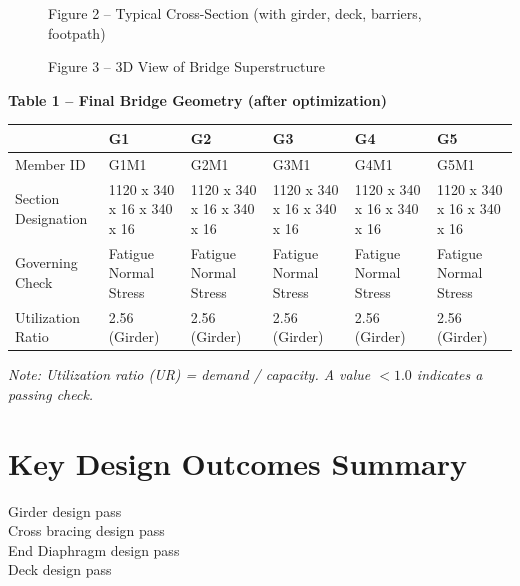 \documentclass[12pt,a4paper]{report}
\numberwithin{table}{chapter}
\numberwithin{figure}{chapter}
\begin{document}
\newpage

\begin{figure}[H]
\centering
{}
\caption*{Figure 2 -- Typical Cross-Section (with girder, deck, barriers, footpath)}
\end{figure}

\begin{figure}[H]
\centering
{}
\caption*{Figure 3 -- 3D View of Bridge Superstructure}
\end{figure}

\noindent\textbf{Table 1 -- Final Bridge Geometry (after optimization)}

\vspace{0.4em}
\noindent
\begin{tabular}{|C{2.8cm}|C{2.4cm}|C{2.4cm}|C{2.4cm}|C{2.4cm}|C{2.4cm}|}
\hline
  \textbf{} &
  \textbf{G1} &
  \textbf{G2} &
  \textbf{G3} &
  \textbf{G4} &
  \textbf{G5} \\
\hline
Member ID & G1M1 & G2M1 & G3M1 & G4M1 & G5M1 \\
\hline
Section Designation & 1120 x 340 x 16 x 340 x 16 & 1120 x 340 x 16 x 340 x 16 & 1120 x 340 x 16 x 340 x 16 & 1120 x 340 x 16 x 340 x 16 & 1120 x 340 x 16 x 340 x 16 \\
\hline
Governing Check & Fatigue Normal Stress & Fatigue Normal Stress & Fatigue Normal Stress & Fatigue Normal Stress & Fatigue Normal Stress \\
\hline
Utilization Ratio & 2.56 (Girder) & 2.56 (Girder) & 2.56 (Girder) & 2.56 (Girder) & 2.56 (Girder) \\
\hline
\end{tabular}

\vspace{0.4em}
\noindent\textit{Note: Utilization ratio (UR) = demand / capacity. A value $< 1.0$ indicates a passing check.}

\vspace{1em}

\section*{Key Design Outcomes Summary}
\label{sec:key-outcomes}

\noindent Girder design pass \\
Cross bracing design pass \\
End Diaphragm design pass \\
Deck design pass
\end{document}
